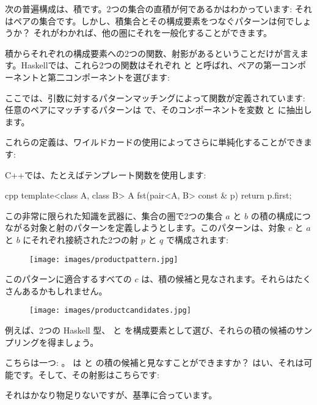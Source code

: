 次の普遍構成は、積です。2つの集合の直積が何であるかはわかっています: それはペアの集合です。しかし、積集合とその構成要素をつなぐパターンは何でしょうか？ それがわかれば、他の圏にそれを一般化することができます。

積からそれぞれの構成要素への2つの関数、射影があるということだけが言えます。Haskellでは、これら2つの関数はそれぞれ  と  と呼ばれ、ペアの第一コンポーネントと第二コンポーネントを選びます:


ここでは、引数に対するパターンマッチングによって関数が定義されています: 任意のペアにマッチするパターンは  で、そのコンポーネントを変数  と  に抽出します。

これらの定義は、ワイルドカードの使用によってさらに単純化することができます: 

C++では、たとえばテンプレート関数を使用します: 

\begin{snip}{cpp}
template<class A, class B> A
fst(pair<A, B> const & p) {
    return p.first;
}
\end{snip}
この非常に限られた知識を武器に、集合の圏で2つの集合 $a$ と $b$ の積の構成につながる対象と射のパターンを定義しようとします。このパターンは、対象 $c$ と $a$ と $b$ にそれぞれ接続された2つの射 $p$ と $q$ で構成されます: 


\begin{figure}[H]
  \centering
  \texttt{[image: images/productpattern.jpg]}
\end{figure}

\noindent
このパターンに適合するすべての $c$ は、積の候補と見なされます。それらはたくさんあるかもしれません。

\begin{figure}[H]
  \centering
  \texttt{[image: images/productcandidates.jpg]}
\end{figure}

\noindent
例えば、2つの Haskell 型、 と  を構成要素として選び、それらの積の候補のサンプリングを得ましょう。

こちらは一つ: 。  は  と  の積の候補と見なすことができますか？ はい、それは可能です。そして、その射影はこちらです: 

それはかなり物足りないですが、基準に合っています。

